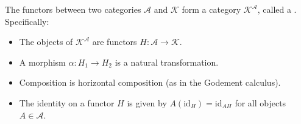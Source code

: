 The functors between two categories $\mathcal{A}$ and $\mathcal{K}$ form a category $\mathcal{K}^\mathcal{A}$, called a . Specifically:
\begin{itemize}
\item The objects of $\mathcal{K}^\mathcal{A}$ are functors $H: \mathcal{A} \longrightarrow \mathcal{K}$.
\item A morphism $\alpha: H_1 \longrightarrow H_2$ is a natural transformation.
\item Composition is horizontal composition (as in the Godement calculus).
\item The identity on a functor $H$ is given by $A(\mathrm{id}_H) = \mathrm{id}_{AH}$ for all objects $A \in \mathcal{A}$.
\end{itemize}
